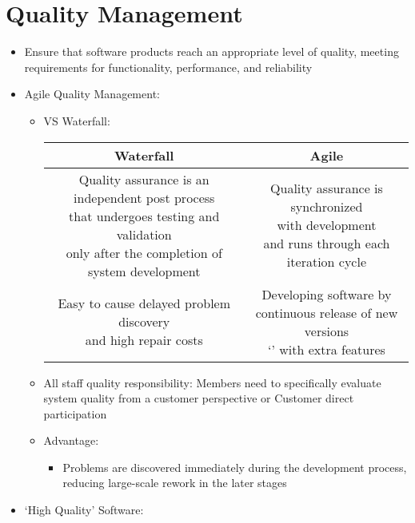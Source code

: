 \documentclass[12pt,openany]{book}
\begin{document}
\section{Quality Management}
\begin{itemize}
    \item Ensure that software products reach an appropriate level of quality, meeting requirements for functionality, performance, and reliability
    \item Agile Quality Management:
    \begin{itemize}
        \item VS Waterfall: 
        \begin{table}[H]
            \centering
            \begin{tabular}{cc}
                \toprule
                \textbf{Waterfall} & \textbf{Agile} \\
                \midrule
                \makecell{Quality assurance is an independent post process \\ that undergoes testing and validation \\ only after the completion of system development} & \makecell{Quality assurance is synchronized \\ with development \\ and runs through each iteration cycle} \\
                \midrule
                \makecell{Easy to cause delayed problem discovery \\ and high repair costs} & \makecell{Developing software by \\ continuous release of new versions \\`' with extra features}\\
                \bottomrule
            \end{tabular}
        \end{table}
        \item All staff quality responsibility: Members need to specifically evaluate system quality from a customer perspective or Customer direct participation
        \item Advantage:
        \begin{itemize}
            \item Problems are discovered immediately during the development process, reducing large-scale rework in the later stages
        \end{itemize}
    \end{itemize}
    \item `High Quality' Software:

\end{itemize}
\end{document}
